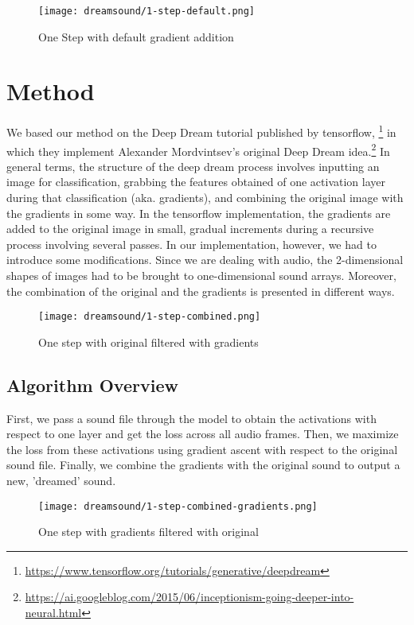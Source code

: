 \documentclass{nime-alternate}
\begin{document}
\begin{figure*}[htbp]
       \centering
              \texttt{[image: dreamsound/1-step-default.png]}
       \caption{One Step with default gradient addition}
       \label{fig:img-1}
\end{figure*}
\section{Method}
We based our method on the Deep Dream tutorial published by tensorflow, \footnote{\url{https://www.tensorflow.org/tutorials/generative/deepdream}} in which they implement Alexander Mordvintsev's original Deep Dream idea.\footnote{\url{https://ai.googleblog.com/2015/06/inceptionism-going-deeper-into-neural.html}} In general terms, the structure of the deep dream process involves inputting an image for classification,  grabbing the features obtained of one activation layer during that classification (aka. gradients), and combining the original image with the gradients in some way. In the tensorflow implementation, the gradients are added to the original image in small, gradual increments during a recursive process involving several passes. In our implementation, however, we had to introduce some modifications. Since we are dealing with audio, the 2-dimensional shapes of images had to be brought to one-dimensional sound arrays. Moreover, the combination of the original and the gradients is presented in different ways.
\begin{figure*}[htbp]
       \centering
              \texttt{[image: dreamsound/1-step-combined.png]}
       \caption{One step with original filtered with gradients}
       \label{fig:img-2}
\end{figure*}
\subsection{Algorithm Overview}
First, we pass a sound file through the model to obtain the activations with respect to one layer and get the loss across all audio frames. Then, we maximize the loss from these activations using gradient ascent with respect to the original sound file. Finally, we combine the gradients with the original sound to output a new, 'dreamed' sound.


\begin{figure*}[htbp]
       \centering
              \texttt{[image: dreamsound/1-step-combined-gradients.png]}
       \caption{One step with gradients filtered with original}
       \label{fig:img-3}
\end{figure*}
\end{document}
